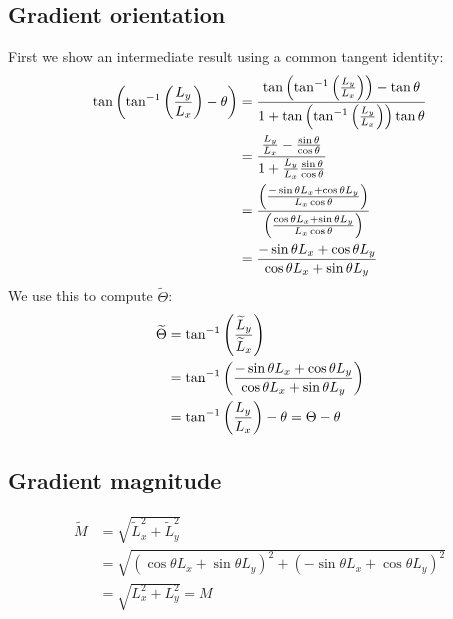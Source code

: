 \documentclass[thesis.tex]{subfiles}
\begin{document}
\subsection{Gradient orientation} \label{apx:rotation_go}
%
First we show an intermediate result using a common tangent identity:
%
\begin{align*}
\tan \left( \tan^{-1} \left( \frac{L_y}{L_x} \right) - \theta \right)
&= \frac{\tan \left( \tan^{-1} \left( \frac{L_y}{L_x} \right) \right) - \tan \theta}{1 + \tan \left( \tan^{-1} \left( \frac{L_y}{L_x} \right) \right) \tan \theta} \\
&= \frac{\frac{L_y}{L_x} - \frac{\sin \theta}{\cos \theta}}{1 + \frac{L_y}{L_x} \frac{\sin \theta}{\cos \theta}} \\
&= \frac{\left(\frac{-\sin \theta L_x + \cos \theta L_y}{L_x \cos \theta}\right)}{\left(\frac{\cos \theta L_x + \sin \theta L_y}{L_x \cos \theta}\right)} \\
&= \frac{-\sin \theta L_x + \cos \theta L_y}{\cos \theta L_x + \sin \theta L_y}
\end{align*}
%
We use this to compute $\widetilde{\Theta}$:
%
\begin{align*}
\widetilde{\Theta} &= \tan^{-1} \left( \frac{\widetilde{L}_y}{\widetilde{L}_x} \right) \\
&= \tan^{-1} \left( \frac{-\sin \theta L_x + \cos \theta L_y}{\cos \theta L_x + \sin \theta L_y} \right) \\
&= \tan^{-1} \left( \frac{L_y}{L_x} \right) - \theta = \Theta - \theta
\end{align*}
%
\subsection{Gradient magnitude} \label{apx:rotation_m}
%
\begin{align*}
\widetilde{M} &= \sqrt{\widetilde{L}_x^2 + \widetilde{L}_y^2} \\
&= \sqrt{(\cos \theta L_x + \sin \theta L_y)^2 + (-\sin \theta L_x + \cos \theta L_y)^2} \\
&= \sqrt{L_x^2 + L_y^2} = M
\end{align*}
%
\end{document}
